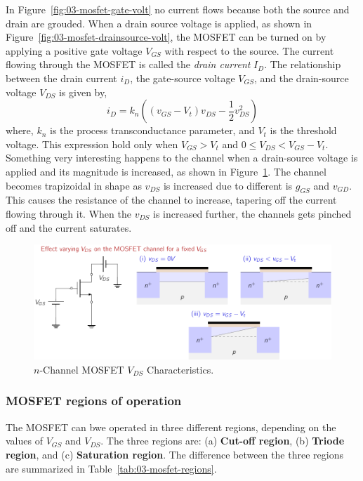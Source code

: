 In Figure~\ref{fig:03-mosfet-gate-volt} no current flows because both the source and drain are grouded. When a drain source voltage is applied, as shown in Figure~\ref{fig:03-mosfet-drainsource-volt}, the MOSFET can be turned on by applying a positive gate voltage $V_{GS}$ with respect to the source. The current flowing through the MOSFET is called the \textit{drain current} $I_D$. The relationship between the drain current $i_D$, the gate-source voltage $V_{GS}$, and the drain-source voltage $V_{DS}$ is given by,
\begin{equation}
    i_D = k_n\left(\left(v_{GS} - V_t\right)v_{DS} - \frac{1}{2}v_{DS}^2\right)
    \label{eq03-mosfet-id-vgs}
\end{equation}
where, $k_n$ is the process transconductance parameter, and $V_t$ is the threshold voltage. This expression hold only when $V_{GS} > V_t$ and $0 \leq V_{DS} < V_{GS} - V_t$. Something very interesting happens to the channel when a drain-source voltage is applied and its magnitude is increased, as shown in Figure~\ref{fig:03-mosfet-vds-pinchoff}. The channel becomes trapizoidal in shape as $v_{DS}$ is increased due to different is $g_{GS}$ and $v_{GD}$. This causes the resistance of the channel to increase, tapering off the current flowing through it. When the $v_{DS}$ is increased further, the channels gets pinched off and the current saturates.
\begin{figure}[b]
    \centering
    \includegraphics[width=1\textwidth]{figure/ch03/fig03-mosfet-vds-pinchoff.pdf}
    \caption{$n$-Channel MOSFET $V_{DS}$ Characteristics.}
    \label{fig:03-mosfet-vds-pinchoff}
\end{figure}

\subsubsection{MOSFET regions of operation}
The MOSFET can bwe operated in three different regions, depending on the values of $V_{GS}$ and $V_{DS}$. The three regions are: (a) \textbf{Cut-off region}, (b) \textbf{Triode region}, and (c) \textbf{Saturation region}. The difference between the three regions are summarized in Table~\ref{tab:03-mosfet-regions}.


